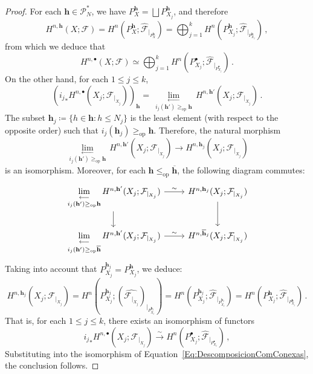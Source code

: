 \documentclass[10pt,a4paper]{amsart}
\newcommand{\cF}{{\mathcal F}}
\newcommand{\cP}{\mathcal{P}}
\newcommand{\h}{\mathbf{h}}
\DeclareMathOperator{\op}{op}
\newcommand{\plim}[1]{\,\underset{#1}{\underset{\longleftarrow}{\lim}}\,}
\begin{document}
\begin{proof}
    For each $\h\in \cP^{*}_N$, we have $P_X^{\h}=\bigsqcup P_{X_j}^\h$, and therefore
    \[
    H^{n,\h}(X;\cF)=H^{n}(P_X^\h;\widehat{\cF}_{|_{P_X^\h}})=\bigoplus_{j=1}^k H^n(P_{X_j}^\h;\widehat{\cF}_{|_{P_{X_j}^{\h}}})\, ,
    \]
    from which we deduce that
    \begin{equation}\label{Eq:DescomposicionComConexas}
        H^{n,\bullet}(X;\cF)\simeq \bigoplus_{j=1}^k H^{n}(P_{X_j}^\bullet;\widehat{\cF}_{|_{P_{X_j}^\bullet}})\,.
    \end{equation}
    On the other hand, for each $1\leq j\leq k$,
    \[
    \left({i_j}_* H^{n,\bullet}(X_j;\cF_{|_{X_j}})\right)_\h=
        \plim{i_j(\h')\geq_{\op} \h}H^{n,\h'}(X_j;\cF_{|_{X_j}})\, .
    \]
    The subset $\h_j\coloneqq \{h\in \h : h\leq N_j\}$ is the least element (with respect to the opposite order) such that $i_j(\h_j)\geq_{\op}\h$. Therefore, the natural morphism
    \[
    \plim{i_j(\h')\geq_{\op} \h}H^{n,\h'}(X_j;\cF_{|_{X_j}})\longrightarrow H^{n,\h_j}(X_j;\cF_{|_{X_j}})
    \]
    is an isomorphism. Moreover, for each $\h\leq_{\op} \overline{\h}$, the following diagram commutes:
    \[
    \begin{tikzcd}
        \plim{i_j(\h')\geq_{\op} \h}H^{n,\h'}(X_j;\cF_{|_{X_j}})\arrow[r,"\sim"]\arrow[d] & H^{n,\h_j}(X_j;\cF_{|_{X_j}})\arrow[d] \\
        \plim{i_j(\h')\geq_{\op} \overline{\h}}H^{n,\h'}(X_j;\cF_{|_{X_j}})\arrow[r,"\sim"] &  H^{n,\overline{\h}_j}(X_j;\cF_{|_{X_j}})
    \end{tikzcd}
    \]
    Taking into account that $P_{X_j}^{\h_j}=P_{X_j}^\h$, we deduce:
    \[
    H^{n,\h_j}(X_j;\cF_{|_{X_j}})=H^n(P_{X_j}^{\h_j};(\widehat{\cF_{|_{X_j}}})_{|_{P_{X_j}^{\h_j}}})=H^{n}(P_{X_j}^{\h_j};\widehat{\cF}_{|_{P_{X_j}^{\h_j}}})=H^n(P_{X_j}^\h;\widehat{\cF}_{|_{P_{X_j}^\h}})\,.
    \]
    That is, for each $1\leq j\leq k$, there exists an isomorphism of functors
    \[
    {i_j}_* H^{n,\bullet}(X_j;\cF_{|_{X_j}})\stackrel{\sim}\longrightarrow H^{n}(P_{X_j}^\bullet;\widehat{\cF}_{|_{P_{X_j}^\bullet}})\,, 
    \]
    Substituting into the isomorphism of Equation~\eqref{Eq:DescomposicionComConexas}, the conclusion follows.
\end{proof}
\end{document}
